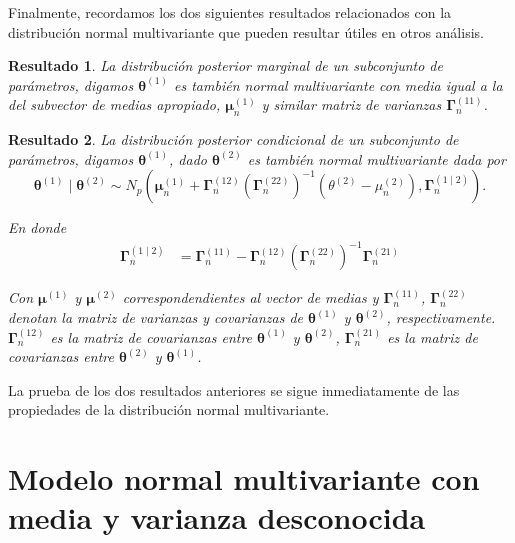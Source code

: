 \documentclass[
  10pt,
  spanish,
]{book}
\newtheorem{proposition}{Resultado}[chapter]
\theoremstyle{definition}
\theoremstyle{definition}
\theoremstyle{definition}
\theoremstyle{definition}
\theoremstyle{remark}
\begin{document}
Finalmente, recordamos los dos siguientes resultados relacionados con la distribución normal multivariante que pueden resultar útiles en otros análisis.

\begin{proposition}
\protect\hypertarget{prp:unnamed-chunk-33}{}{\label{prp:unnamed-chunk-33} }La distribución posterior marginal de un subconjunto de parámetros, digamos \(\boldsymbol \theta^{(1)}\) es también normal multivariante con media igual a la del subvector de medias apropiado, \(\boldsymbol \mu_n^{(1)}\) y similar matriz de varianzas \(\boldsymbol \Gamma_n^{(11)}\).
\end{proposition}

\begin{proposition}
\protect\hypertarget{prp:unnamed-chunk-34}{}{\label{prp:unnamed-chunk-34} }La distribución posterior condicional de un subconjunto de parámetros, digamos \(\boldsymbol \theta^{(1)}\), dado \(\boldsymbol \theta^{(2)}\) es también normal multivariante dada por
\begin{equation*}
  \boldsymbol \theta^{(1)} \mid \boldsymbol \theta^{(2)} \sim N_p \left(\boldsymbol \mu_n^{(1)}+\boldsymbol \Gamma_n^{(12)}\left(\boldsymbol \Gamma_n^{(22)}\right)^{-1}
  \left(\theta^{(2)}-\mu_n^{(2)}\right),\boldsymbol \Gamma_n^{(1 \mid 2)}\right).
\end{equation*}

En donde
\begin{align}
  \boldsymbol \Gamma_n^{(1 \mid 2)}&= \boldsymbol \Gamma_n^{(11)}-\boldsymbol \Gamma_n^{(12)}\left(\boldsymbol \Gamma_n^{(22)}\right)^{-1}\boldsymbol \Gamma_n^{(21)}
\end{align}

Con \(\boldsymbol \mu^{(1)}\) y \(\boldsymbol \mu^{(2)}\) correspondendientes al vector de medias y \(\boldsymbol \Gamma_n^{(11)}\), \(\boldsymbol \Gamma_n^{(22)}\) denotan la matriz de varianzas y covarianzas de \(\boldsymbol \theta^{(1)}\) y \(\boldsymbol \theta^{(2)}\), respectivamente. \(\boldsymbol \Gamma_n^{(12)}\) es la matriz de covarianzas entre \(\boldsymbol \theta^{(1)}\) y \(\boldsymbol \theta^{(2)}\), \(\boldsymbol \Gamma_n^{(21)}\) es la matriz de covarianzas entre \(\boldsymbol \theta^{(2)}\) y \(\boldsymbol \theta^{(1)}\).
\end{proposition}

La prueba de los dos resultados anteriores se sigue inmediatamente de las propiedades de la distribución normal multivariante.

\hypertarget{modelo-normal-multivariante-con-media-y-varianza-desconocida}{%
\section{Modelo normal multivariante con media y varianza desconocida}\label{modelo-normal-multivariante-con-media-y-varianza-desconocida}}
\end{document}
